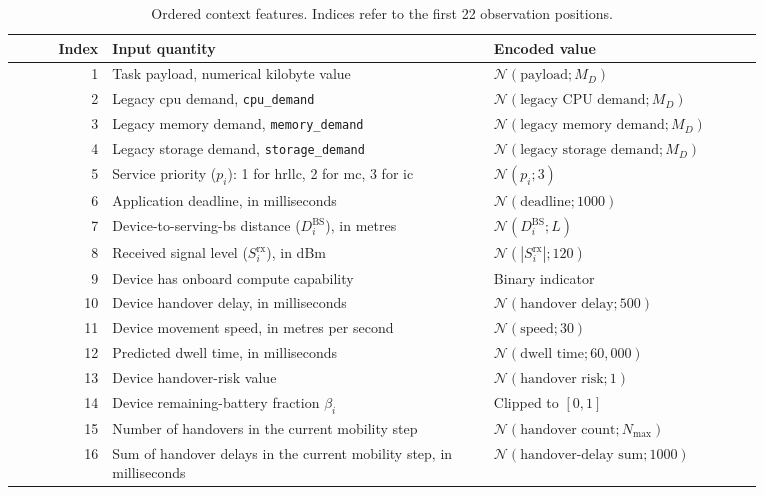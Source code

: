 \begin{table}[!htbp]
\centering
\caption{Ordered context features. Indices refer to the first 22 observation positions.}
\label{tab:state-context-features}
\small
\setlength{\tabcolsep}{5pt}
\renewcommand{\arraystretch}{1.12}
\begin{tabular}{@{}r p{0.51\linewidth} p{0.36\linewidth}@{}}
\toprule
Index & Input quantity & Encoded value \\
\midrule
1 & Task payload, numerical kilobyte value & \(\mathcal N(\text{payload};M_D)\) \\
2 & Legacy \acs{cpu} demand, \texttt{cpu\_demand} & \(\mathcal N(\text{legacy CPU demand};M_D)\) \\
3 & Legacy memory demand, \texttt{memory\_demand} & \(\mathcal N(\text{legacy memory demand};M_D)\) \\
4 & Legacy storage demand, \texttt{storage\_demand} & \(\mathcal N(\text{legacy storage demand};M_D)\) \\
5 & Service priority (\(p_i\)): 1 for \acs{hrllc}, 2 for \acs{mc}, 3 for \acs{ic} & \(\mathcal N(p_i;3)\) \\
6 & Application deadline, in milliseconds & \(\mathcal N(\text{deadline};1000)\) \\
7 & Device-to-serving-\acs{bs} distance (\(D_i^{\mathrm{BS}}\)), in metres & \(\mathcal N(D_i^{\mathrm{BS}};L)\) \\
8 & Received signal level (\(S_i^{\mathrm{rx}}\)), in dBm & \(\mathcal N(|S_i^{\mathrm{rx}}|;120)\) \\
9 & Device has onboard compute capability & Binary indicator \\
10 & Device handover delay, in milliseconds & \(\mathcal N(\text{handover delay};500)\) \\
11 & Device movement speed, in metres per second & \(\mathcal N(\text{speed};30)\) \\
12 & Predicted dwell time, in milliseconds & \(\mathcal N(\text{dwell time};60{,}000)\) \\
13 & Device handover-risk value & \(\mathcal N(\text{handover risk};1)\) \\
14 & Device remaining-battery fraction \(\beta_i\) & Clipped to \([0,1]\) \\
15 & Number of handovers in the current mobility step & \(\mathcal N(\text{handover count};N_{\max})\) \\
16 & Sum of handover delays in the current mobility step, in milliseconds & \(\mathcal N(\text{handover-delay sum};1000)\) \\

\end{tabular}
\end{table}

